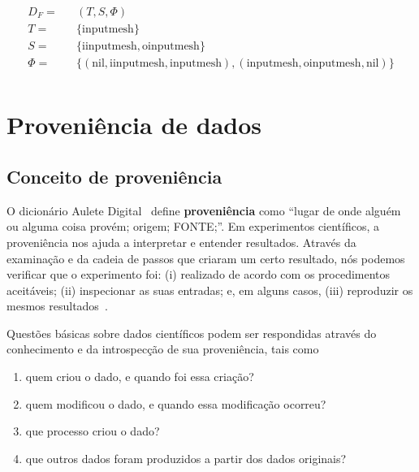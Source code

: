 \[
\begin{aligned}
D_F = && (T, S, \Phi) \\
T = && \{ \textrm{inputmesh} \} \\
S = && \{ \textrm{iinputmesh}, \textrm{oinputmesh} \} \\
\Phi = && \{ (\textrm{nil}, \textrm{iinputmesh}, \textrm{inputmesh}),
(\textrm{inputmesh}, \textrm{oinputmesh}, \textrm{nil})
\} \\
\end{aligned}
\]


\section{Proveniência de dados}

\subsection{Conceito de proveniência}  %

O dicionário Aulete Digital~\cite{auletedigitalonline} define \textbf{proveniência} como
``lugar de onde alguém ou alguma coisa provém; origem; FONTE;''. Em experimentos científicos, a proveniência nos ajuda a interpretar e entender resultados. Através da examinação e da cadeia de passos que criaram um certo resultado, nós podemos verificar que o experimento foi: (i) realizado de acordo com os procedimentos aceitáveis; (ii) inspecionar as suas entradas; e, em alguns casos, (iii) reproduzir os mesmos resultados~\cite{freire2008provenance}.

Questões básicas sobre dados científicos podem ser respondidas através do conhecimento e da introspecção de sua proveniência, tais como

\begin{enumerate}
    \item quem criou o dado, e quando foi essa criação?
    \item quem modificou o dado, e quando essa modificação ocorreu?
    \item que processo criou o dado?
    \item que outros dados foram produzidos a partir dos dados originais?
\end{enumerate}


